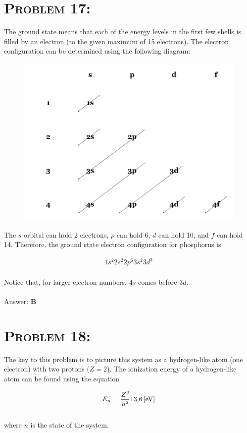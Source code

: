 \documentclass{article}
\begin{document}

\section{\textsc{Problem 17:}} The ground state means that each of the energy levels in the first few shells is filled by an electron (to the given maximum of 15 electrons). The electron configuration can be determined using the following diagram:

\begin{figure}[H]
\includegraphics[width = .50\textwidth]{img/electron_config.png}\centering
\end{figure}
 \noindent The $s$ orbital can hold 2 electrons, $p$ can hold 6, $d$ can hold 10, and $f$ can hold 14. Therefore, the ground state electron configuration for phosphorus is

 \begin{gather}
 \boxed{1s^{2} 2s^{2} 2p^{6} 3s^{2} 3d^{3}}\nonumber
 \end{gather}
 \\
 Notice that, for larger electron numbers, $4s$ comes before $3d$.
\\\\
Answer: \textbf{\textcolor{ProcessBlue}B}\\


\section{\textsc{Problem 18:}} The key to this problem is to picture this system as a hydrogen-like atom (one electron) with two protons ($Z = 2$). The ionization energy of a hydrogen-like atom can be found using the equation

\begin{gather}
E_{n} = \frac{Z^{2}}{n^{2}} \unit[13.6]{[eV]}
\end{gather}
\\
where $n$ is the state of the system.
\end{document}

